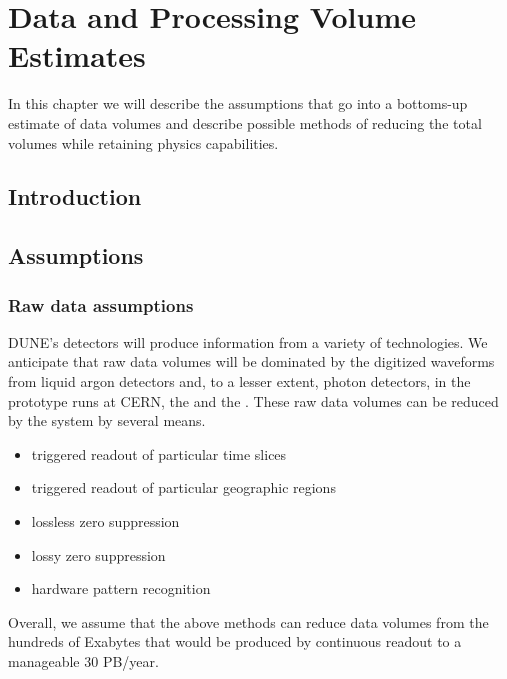 \documentclass[../main-v1.tex]{subfiles}
\begin{document}
\chapter{Data and Processing Volume Estimates }
\label{ch:est}
In this chapter we will describe the assumptions that go into a bottoms-up estimate of data volumes and describe possible methods of reducing the total volumes while retaining physics capabilities. 

\section{Introduction }


\section{Assumptions }
\label{sec:est:assume}  %

\subsection{Raw data assumptions }
DUNE's detectors will produce information from a variety of technologies.  We anticipate that raw data volumes will be dominated by the digitized waveforms from liquid argon detectors and, to a lesser extent, photon detectors, in the prototype runs at CERN, the  and the .  
These raw data volumes can be reduced by the  system by several means.


\begin{itemize} 
\item triggered readout of particular time slices
\item triggered readout of particular geographic regions
\item lossless zero suppression
\item lossy zero suppression
\item hardware pattern recognition
\end{itemize}

Overall, we assume that the above methods can reduce data volumes from the hundreds of Exabytes that would be produced by continuous readout to a manageable 30 PB/year. 
\end{document}
